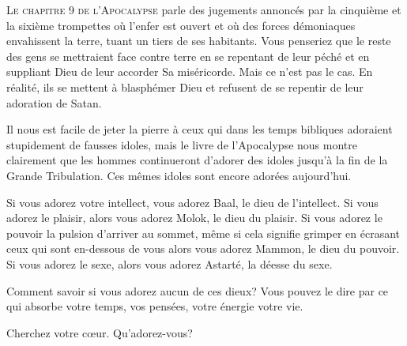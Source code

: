 

\lettrine{L}{e chapitre 9 de l'Apocalypse} parle des jugements
 annoncés par la cinquième et la sixième trompettes où l'enfer est ouvert
 et où des forces démoniaques envahissent la terre,
 tuant un tiers de ses habitants.
 Vous penseriez que le reste des gens se mettraient face contre terre
 en se repentant de leur péché et en suppliant Dieu de leur accorder
 Sa miséricorde. Mais ce n'est pas le cas.
 En réalité, ils se mettent à blasphémer Dieu et refusent
 de se repentir de leur adoration de Satan.


Il nous est facile de jeter la pierre à ceux qui dans les temps bibliques
 adoraient stupidement de fausses idoles, mais le livre de l'Apocalypse
 nous montre clairement que les hommes continueront d'adorer des idoles
 jusqu'à la fin de la Grande Tribulation.
 Ces mêmes idoles sont encore adorées aujourd'hui.

Si vous adorez votre intellect, vous adorez Baal, le dieu de l'intellect.
 Si vous adorez le plaisir, alors vous adorez Molok, le dieu du plaisir.
 Si vous adorez le pouvoir \ocadr la pulsion d'arriver au sommet,
 même si cela signifie grimper en écrasant ceux qui sont en-dessous
 de vous \fcadr{} alors vous adorez Mammon, 
 le dieu du pouvoir. Si vous adorez le sexe, alors vous adorez Astarté,
 la déesse du sexe.

Comment savoir si vous adorez aucun 
 de ces dieux?
 Vous pouvez le dire par ce qui absorbe votre temps,
 vos pensées, votre énergie \ocadr votre vie.

Cherchez 
 votre c\oe{}ur. Qu'adorez-vous?

\dvrule




